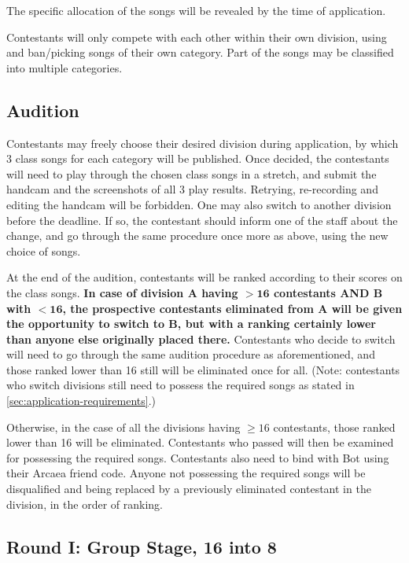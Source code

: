 \documentclass{article}
\newcommand{\alert}[1]{{\color{red} #1}}
\begin{document}
\alert{
	The specific allocation of the songs  %
	will be revealed by the time of application.
}

Contestants will only compete with each other
within their own division,
using and ban/picking songs of their own category.
Part of the songs may be classified into multiple categories.

\subsection{Audition}

Contestants may freely choose their desired division
during application,
by which 3 class songs for each category will be published.
Once decided, the contestants will need to play through the chosen class songs in a stretch,
and submit the handcam and the screenshots of all 3 play results.
Retrying, re-recording and editing the handcam will be forbidden.  %
One may also switch to another division before the deadline.
If so, the contestant should inform one of the staff about the change,
and go through the same procedure once more as above,
using the new choice of songs.  %

At the end of the audition,
contestants will be ranked
according to their scores on the class songs.
\textbf{In case of division A having $\mathbf{> 16}$ contestants
	AND B with $\mathbf{< 16}$,
	the prospective contestants eliminated from A
	will be given the opportunity to switch to B,
	but with a ranking certainly lower than
	anyone else originally placed there.}
Contestants who decide to switch
will need to go through the same
audition procedure as aforementioned,
and those ranked lower than 16 still will be eliminated
once for all.  %
(Note: contestants who switch divisions
still need to possess the required songs
as stated in \cref{sec:application-requirements}.)

Otherwise, in the case of
all the divisions having $\geq 16$ contestants,
those ranked lower than 16 will be eliminated.
Contestants who passed will then be examined for
possessing the required songs.
Contestants also need to bind with Bot
using their Arcaea friend code.
Anyone not possessing the required songs
will be disqualified and being
replaced by a previously eliminated
contestant in the division,
in the order of ranking.

\subsection{Round I: Group Stage, 16 into 8}
\end{document}
